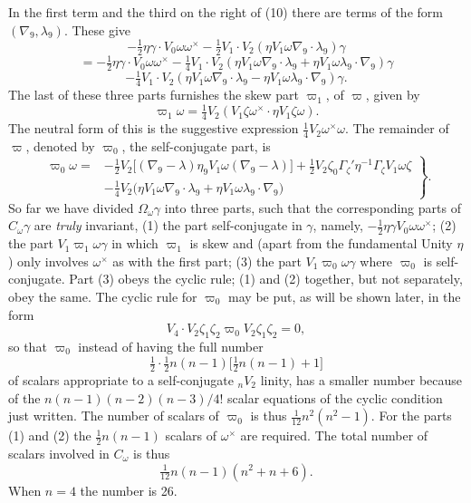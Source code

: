 \documentclass[11pt]{article}
\begin{document}
\indent In the first term and the third on the right of (10) there are terms of the form $(\nabla_9,\lambda_9)$. These give
\[
-\tfrac12\eta\gamma\mathbin{\cdot}V_0\omega\omega^\times-\tfrac12V_1\mathbin{\cdot}V_2(\eta V_1\omega\nabla_9\mathbin{\cdot}\lambda_9)\gamma
\]
\[
=-\tfrac12\eta\gamma\mathbin{\cdot}V_0\omega\omega^\times-\tfrac14V_1\mathbin{\cdot}V_2(\eta V_1\omega\nabla_9\mathbin{\cdot}\lambda_9+\eta V_1\omega\lambda_9\mathbin{\cdot}\nabla_9)\gamma
\]
\[
-\tfrac14V_1\mathbin{\cdot}V_2(\eta V_1\omega\nabla_9\mathbin{\cdot}\lambda_9-\eta V_1\omega\lambda_9\mathbin{\cdot}\nabla_9)\gamma.
\]
The last of these three parts furnishes the skew part $\varpi_1$, of $\varpi$, given by
\begin{equation}\varpi_1\omega=\tfrac14V_2(V_1\zeta\omega^\times\mathbin{\cdot}\eta V_1\zeta\omega).\tag{11}\end{equation}
The neutral form of this is the suggestive expression $\tfrac14V_2\omega^\times\omega$. The remainder of $\varpi$, denoted by $\varpi_0$, the self-conjugate part, is
\begin{equation}
\left.\begin{aligned}
\varpi_0\omega={}&-\tfrac12V_2\bigl[(\nabla_9-\lambda)\eta_9V_1\omega(\nabla_9-\lambda)\bigr]+\tfrac12V_2\zeta_0\Gamma_\zeta'\eta^{-1}\Gamma_\zeta V_1\omega\zeta\\
&-\tfrac14V_2\bigl(\eta V_1\omega\nabla_9\mathbin{\cdot}\lambda_9+\eta V_1\omega\lambda_9\mathbin{\cdot}\nabla_9\bigr)
\end{aligned}\right\}.\tag{12}
\end{equation}
So far we have divided $\Omega_\omega\gamma$ into three parts, such that the corresponding parts of $C_\omega\gamma$ are \emph{truly} invariant, (1) the part self-conjugate in $\gamma$, namely, $-\tfrac12\eta\gamma V_0\omega\omega^\times$; (2) the part $V_1\varpi_1\omega\gamma$ in which $\varpi_1$ is skew and (apart from the fundamental Unity $\eta$) only involves $\omega^\times$ as with the first part; (3) the part $V_1\varpi_0\omega\gamma$ where $\varpi_0$ is self-conjugate. Part (3) obeys the cyclic rule; (1) and (2) together, but not separately, obey the same. The cyclic rule for $\varpi_0$ may be put, as will be shown later, in the form
\[
V_4\mathbin{\cdot}V_2\zeta_1\zeta_2\varpi_0V_2\zeta_1\zeta_2=0,
\]
so that $\varpi_0$ instead of having the full number
\[
\tfrac12\mathbin{\cdot}\tfrac12n(n-1)\bigl[\tfrac12n(n-1)+1\bigr]
\]
of scalars appropriate to a self-conjugate ${}_nV_2$ linity, has a smaller number because of the $n(n-1)(n-2)(n-3)/4!$ scalar equations of the cyclic condition just written. The number of scalars of $\varpi_0$ is thus $\tfrac1{12}n^2(n^2-1)$. For the parts (1) and (2) the $\tfrac12n(n-1)$ scalars of $\omega^\times$ are required. The total number of scalars involved in $C_\omega$ is thus
\[
\tfrac1{12}n(n-1)(n^2+n+6).
\]
When $n=4$ the number is 26.
\end{document}
